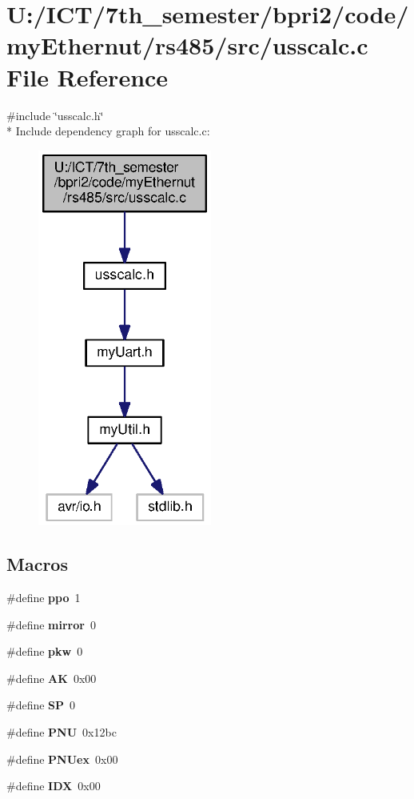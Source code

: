\section{U\+:/\+I\+C\+T/7th\+\_\+semester/bpri2/code/my\+Ethernut/rs485/src/usscalc.c File Reference}
\label{usscalc_8c}
{\ttfamily \#include \char`\"{}usscalc.\+h\char`\"{}}\\*
Include dependency graph for usscalc.\+c\+:\nopagebreak
\begin{figure}[H]
\begin{center}
\leavevmode
\includegraphics[width=162pt]{usscalc_8c__incl}
\end{center}
\end{figure}
\subsection*{Macros}
\begin{DoxyCompactItemize}
\item 
\#define {\bf ppo}~1
\item 
\#define {\bf mirror}~0
\item 
\#define {\bf pkw}~0
\item 
\#define {\bf A\+K}~0x00
\item 
\#define {\bf S\+P}~0
\item 
\#define {\bf P\+N\+U}~0x12bc
\item 
\#define {\bf P\+N\+Uex}~0x00
\item 
\#define {\bf I\+D\+X}~0x00
\end{DoxyCompactItemize}
